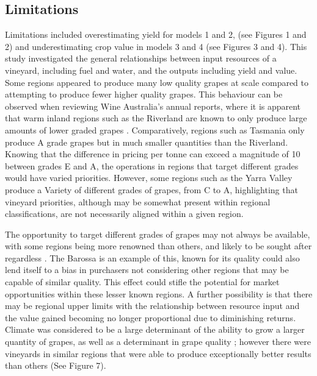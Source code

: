 \documentclass[review,12pt,authoryear]{elsarticle}
\begin{document}
\begin{linenumbers}
\subsection{Limitations}
Limitations included overestimating yield for models 1 and 2, (see Figures 1 and 2) and underestimating crop value in models 3 and 4 (see Figures 3 and 4).
This study investigated the general relationships between input resources of a vineyard, including fuel and water, and the outputs including yield and value. Some regions appeared to produce many low quality grapes at scale compared to attempting to produce fewer higher quality grapes. This behaviour can be observed when reviewing Wine Australia's annual reports, where it is apparent that warm inland regions such as the Riverland are known to only produce large amounts of lower graded grapes \cite{wineaustraliaNationalVintageReport2022,winemakersfederationofaustraliaNationalVintageReport2017}. Comparatively, regions such as Tasmania only produce A grade grapes but in much smaller quantities than the Riverland. Knowing that the difference in pricing per tonne can exceed a magnitude of 10 between grades E and A, the operations in regions that target different grades would have varied priorities. However, some regions such as the Yarra Valley produce a Variety of different grades of grapes, from C to A, highlighting that vineyard priorities, although may be somewhat present within regional classifications, are not necessarily aligned within a given region. 

The opportunity to target different grades of grapes may not always be available, with some regions being more renowned than others, and likely to be sought after regardless \citep{hallidayAustralianWineEncyclopedia2009}. The Barossa is an example of this, known for its quality could also lend itself to a bias in purchasers not considering other regions that may be capable of similar quality. This effect could stifle the potential for market opportunities within these lesser known regions. A further possibility is that there may be regional upper limits with the relationship between resource input and the value gained becoming no longer proportional due to diminishing returns. Climate was considered to be a large determinant of the ability to grow a larger quantity of grapes, as well as a determinant in grape quality \citep{agostaRegionalClimateVariability2012}; however there were vineyards in similar regions that were able to produce exceptionally better results than others (See Figure 7).


\end{linenumbers}
\end{document}
